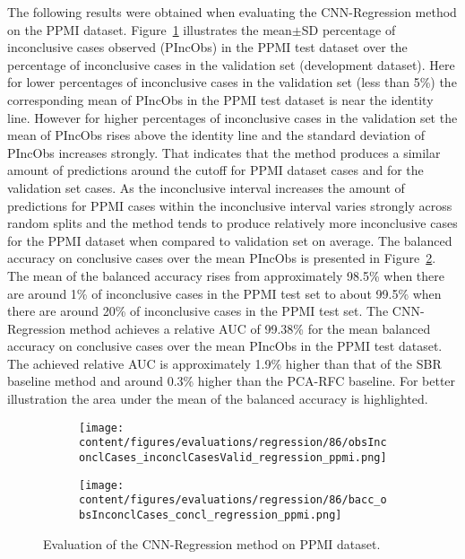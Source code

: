 The following results were obtained when evaluating the CNN-Regression method on the PPMI dataset.
Figure~\ref{fig:obsInconclCases_inconclCasesValid_regression_ppmi} illustrates the
mean$\pm$SD percentage of inconclusive cases observed (PIncObs) in the PPMI test dataset 
over the percentage of inconclusive cases in the validation set (development dataset).
Here for lower percentages of inconclusive cases in the validation set (less than 5\%) the corresponding 
mean of PIncObs in the PPMI test dataset is near the identity line.
However for higher percentages of inconclusive cases in the validation set the mean of PIncObs rises above the identity line
and the standard deviation of PIncObs increases strongly.
That indicates that the method produces a similar amount of predictions around the cutoff for PPMI dataset cases and 
for the validation set cases.
As the inconclusive interval increases the amount of predictions for PPMI cases within the inconclusive interval 
varies strongly across random splits and the method tends to produce relatively more inconclusive cases for the 
PPMI dataset when compared to validation set on average.
The balanced accuracy on conclusive cases over the mean PIncObs is presented in Figure~\ref{fig:bacc_obsInconclCases_concl_regression_ppmi}.
The mean of the balanced accuracy rises from approximately 98.5\% 
when there are around 1\% of inconclusive cases in the PPMI test set to about 99.5\% 
when there are around 20\% of inconclusive cases in the PPMI test set.
The CNN-Regression method achieves a relative AUC of 99.38\% for the mean balanced accuracy on conclusive cases 
over the mean PIncObs in the PPMI test dataset.
The achieved relative AUC is approximately 1.9\% higher than that of the SBR baseline method 
and around 0.3\% higher than the PCA-RFC baseline.
For better illustration the area under the mean of the balanced accuracy is highlighted.


\begin{figure}[ht]
  \begin{subfigure}{0.9\textwidth}
    \centering
    \texttt{[image: content/figures/evaluations/regression/86/obsInconclCases\_inconclCasesValid\_regression\_ppmi.png]}
    \label{fig:obsInconclCases_inconclCasesValid_regression_ppmi}
  \end{subfigure}
  \hfill
  \begin{subfigure}{0.9\textwidth}
    \centering
    \texttt{[image: content/figures/evaluations/regression/86/bacc\_obsInconclCases\_concl\_regression\_ppmi.png]}
    \label{fig:bacc_obsInconclCases_concl_regression_ppmi}
  \end{subfigure}
  \caption{Evaluation of the CNN-Regression method on PPMI dataset.}
  \label{fig:perf_regression_ppmi}
\end{figure}



